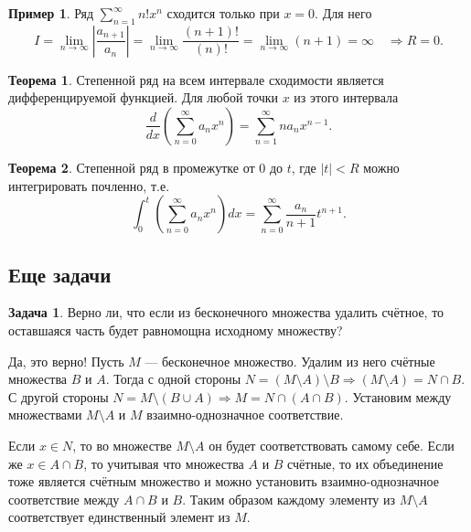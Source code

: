 \documentclass[pdftex, 12pt, a4paper]{article}
\renewcommand{\to}{\rightarrow}
\theoremstyle{definition} %
\newtheorem{myex}{Пример}
\newtheorem{myth}{Теорема}
\newtheorem{problem}{Задача}
\numberwithin{problem}{section}
\numberwithin{blits}{section}
\begin{document}
\begin{myex}

Ряд $\displaystyle \sum_{n=1}^{\infty} n! x^n$ сходится только при $x=0$. Для него\[ I = \displaystyle \lim_{n \to \infty} \left| \frac{a_{n+1}}{a_n} \right| =\displaystyle \lim_{n \to \infty} \frac{(n+1)!}{(n)!} = \lim_{n \to \infty} (n+1) = \infty \quad \Rightarrow R = 0.\]

\end{myex}

\begin{myth}
Степенной ряд на всем интервале сходимости является дифференцируемой функцией. Для любой точки $x$ из этого интервала
\[ \frac{d}{dx}\left( \sum_{n=0}^{\infty} a_n x^n \right) = \sum_{n=1}^{\infty} n a_n x^{n-1}.\]
\end{myth}

\begin{myth}
Степенной ряд в промежутке от 0 до $t$, где $|t|<R$ можно интегрировать почленно, т.е.
\[ \int_0^t \left( \sum_{n=0}^{\infty} a_n x^n \right)dx = \sum_{n=0}^{\infty} \frac{a_n}{n+1} t^{n+1}.\]
\end{myth}


\subsection{Еще задачи}

\begin{problem}
Верно ли, что если из бесконечного множества удалить счётное, то оставшаяся часть будет равномощна исходному множеству?


\begin{sol}
Да, это верно! Пусть $M$ --- бесконечное множество. Удалим из него счётные множества $B$ и $A$. Тогда с одной стороны $N = (M\setminus A)\setminus B \Rightarrow (M \setminus A) = N \cap B $. С другой стороны $N = M \setminus (B \cup A) \Rightarrow M = N \cap (A \cap B)$. Установим между множествами $M\setminus A$ и $M$ взаимно-однозначное соответствие.

Если $x \in N$, то во множестве  $M\setminus A$ он будет соответствовать самому себе. Если же $x \in A \cap B$, то учитывая что множества $A$ и $B$ счётные, то их объединение тоже является счётным множество и можно установить взаимно-однозначное соответствие между $A \cap B$ и $B$. Таким образом каждому элементу из $M\setminus A$ соответствует единственный элемент из $M$.
\end{sol}
\end{problem}
\end{document}
